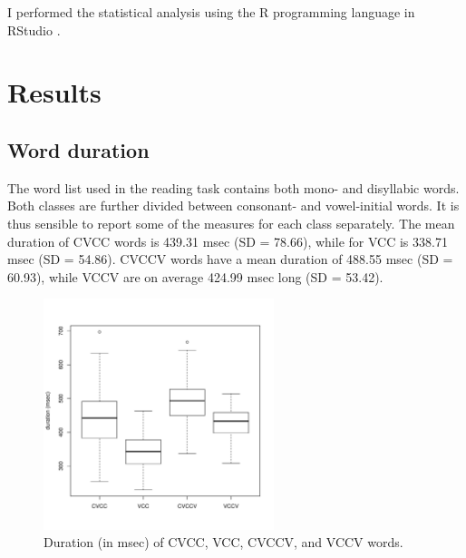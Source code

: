 \documentclass[11pt,a4paper,openany]{memoir}\usepackage[]{graphicx}\usepackage[]{color}
\newenvironment{knitrout}{}{} %
\begin{document}
I performed the statistical analysis using the R programming language \citep{r-core-team2015} in RStudio \citep{rstudio-team2015}.
















\chapter{Results}


\section{Word duration}


The word list used in the reading task contains both mono- and disyllabic words.
Both classes are further divided between consonant- and vowel-initial words.
It is thus sensible to report some of the measures for each class separately.
The mean duration of CVCC words is 439.31 msec (SD = 78.66), while for VCC is 338.71 msec (SD = 54.86).
CVCCV words have a mean duration of 488.55 msec (SD = 60.93), while VCCV are on average 424.99 msec long (SD = 53.42).

\begin{figure}
\centering
\begin{knitrout}
\color{fgcolor}
\includegraphics[width=0.6\textwidth]{img/word-duration-1} 

\end{knitrout}
\caption{Duration (in msec) of CVCC, VCC, CVCCV, and VCCV words.}
\label{f:worddur}
\end{figure}
\end{document}
